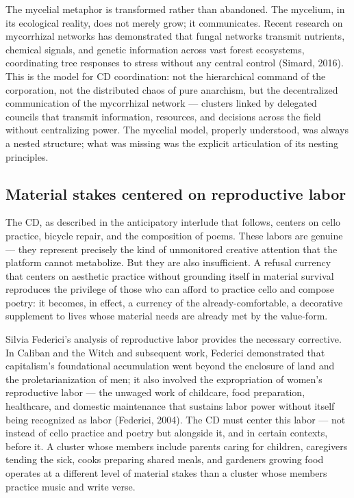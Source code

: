 The mycelial metaphor is transformed rather than abandoned. The mycelium, in its ecological reality, does not merely grow; it communicates. Recent research on mycorrhizal networks has demonstrated that fungal networks transmit nutrients, chemical signals, and genetic information across vast forest ecosystems, coordinating tree responses to stress without any central control (Simard, 2016). This is the model for CD coordination: not the hierarchical command of the corporation, not the distributed chaos of pure anarchism, but the decentralized communication of the mycorrhizal network — clusters linked by delegated councils that transmit information, resources, and decisions across the field without centralizing power. The mycelial model, properly understood, was always a nested structure; what was missing was the explicit articulation of its nesting principles.

\subsection{Material stakes centered on reproductive labor}

The CD, as described in the anticipatory interlude that follows, centers on cello practice, bicycle repair, and the composition of poems. These labors are genuine — they represent precisely the kind of unmonitored creative attention that the platform cannot metabolize. But they are also insufficient. A refusal currency that centers on aesthetic practice without grounding itself in material survival reproduces the privilege of those who can afford to practice cello and compose poetry: it becomes, in effect, a currency of the already-comfortable, a decorative supplement to lives whose material needs are already met by the value-form.

Silvia Federici's analysis of reproductive labor provides the necessary corrective. In Caliban and the Witch and subsequent work, Federici demonstrated that capitalism's foundational accumulation went beyond the enclosure of land and the proletarianization of men; it also involved the expropriation of women's reproductive labor — the unwaged work of childcare, food preparation, healthcare, and domestic maintenance that sustains labor power without itself being recognized as labor (Federici, 2004). The CD must center this labor — not instead of cello practice and poetry but alongside it, and in certain contexts, before it. A cluster whose members include parents caring for children, caregivers tending the sick, cooks preparing shared meals, and gardeners growing food operates at a different level of material stakes than a cluster whose members practice music and write verse.

